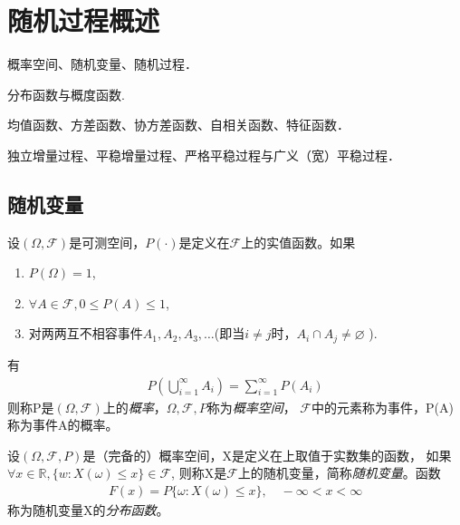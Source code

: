 
\chapter{随机过程概述}

\begin{compactitem}
	\item 概率空间、随机变量、随机过程．
	\item 分布函数与概度函数.
	\item 均值函数、方差函数、协方差函数、自相关函数、特征函数．
	\item 独立增量过程、平稳增量过程、严格平稳过程与广义（宽）平稳过程．
\end{compactitem}

\section{随机变量}\label{sec:RandomVar}

\begin{definition}\label{def:prob-space}
	设\((\Omega,\mathscr{F})\)是可测空间，\(P(\cdot)\)是定义在\(\mathscr{F}\)上的实值函数。如果
	\begin{enumerate}[\bfseries (1)]
		\item \(P(\Omega)=1\),
		\item \(\forall A\in \mathscr{F},0\leq P(A)\leq 1\),
		\item 对两两互不相容事件\(A_1,A_2,A_3,\dots\)(即当\(i\neq j\)时，\(A_i \cap A_j\neq \varnothing\) ).
	\end{enumerate}
	有\begin{align*}
		P\left(\bigcup_{i=1}^{\infty} A_i\right)=\sum_{i=1}^{\infty}P(A_i)
	\end{align*}
	则称P是\((\Omega,\mathscr{F})\)上的\emph{概率}，\(\Omega,\mathscr{F},P\)称为\emph{概率空间}，
	\(\mathscr{F}\)中的元素称为事件，P(A)称为事件A的概率。
\end{definition}


\begin{definition}\label{def:RV-CDF}
	设\((\Omega,\mathscr{F},P)\)是（完备的）概率空间，X是定义在上取值于实数集的函数，
	如果\(\forall x \in \mathbb{R} , \{w : X(\omega)\leqslant x\}\in \mathscr{F}\),
	则称X是\(\mathscr{F}\)上的随机变量，简称\emph{随机变量}。函数
	\begin{align*}
		F(x)=P\{\omega:X(\omega)\leqslant x\},\quad -\infty<x<\infty
	\end{align*}
	称为随机变量X的\emph{分布函数}。
\end{definition}

